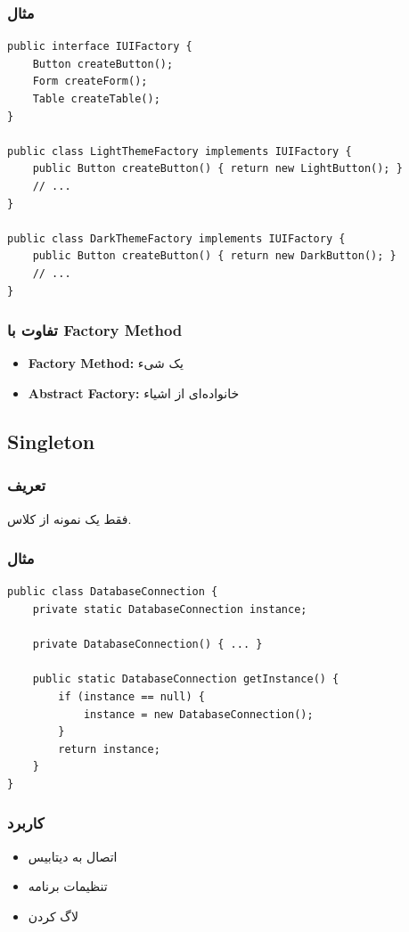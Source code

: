 \documentclass[12pt, a4paper]{article}
\begin{document}
\subsubsection{مثال}
\begin{lstlisting}
public interface IUIFactory {
    Button createButton();
    Form createForm();
    Table createTable();
}

public class LightThemeFactory implements IUIFactory {
    public Button createButton() { return new LightButton(); }
    // ...
}

public class DarkThemeFactory implements IUIFactory {
    public Button createButton() { return new DarkButton(); }
    // ...
}
\end{lstlisting}

\subsubsection{تفاوت با Factory Method}
\begin{itemize}
    \item \textbf{Factory Method:} یک شیء
    \item \textbf{Abstract Factory:} خانواده‌ای از اشیاء
\end{itemize}

\subsection{Singleton}

\subsubsection{تعریف}
فقط یک نمونه از کلاس.

\subsubsection{مثال}
\begin{lstlisting}
public class DatabaseConnection {
    private static DatabaseConnection instance;
    
    private DatabaseConnection() { ... }
    
    public static DatabaseConnection getInstance() {
        if (instance == null) {
            instance = new DatabaseConnection();
        }
        return instance;
    }
}
\end{lstlisting}

\subsubsection{کاربرد}
\begin{itemize}
    \item اتصال به دیتابیس
    \item تنظیمات برنامه
    \item لاگ کردن
\end{itemize}
\end{document}
